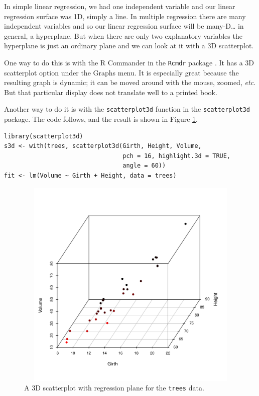 \documentclass[captions=tableheading]{scrbook}
\begin{document}
In simple linear regression, we had one independent variable and our linear regression surface was 1D, simply a line. In multiple regression there are many independent variables and so our linear regression surface will be many-D\ldots{} in general, a hyperplane. But when there are only two explanatory variables the hyperplane is just an ordinary plane and we can look at it with a 3D scatterplot. 

One way to do this is with the \textsf{R} Commander in the \texttt{Rcmdr} package \cite{Foxrcmdr}. It has a 3D scatterplot option under the \textsf{Graphs} menu. It is especially great because the resulting graph is dynamic; it can be moved around with the mouse, zoomed, \emph{etc}. But that particular display does not translate well to a printed book.

Another way to do it is with the \texttt{scatterplot3d} function in the \texttt{scatterplot3d} package. The code follows, and the result is shown in Figure \ref{fig:3D-scatterplot-trees}.


\begin{verbatim}
library(scatterplot3d)
s3d <- with(trees, scatterplot3d(Girth, Height, Volume, 
                                 pch = 16, highlight.3d = TRUE, 
                                 angle = 60))
fit <- lm(Volume ~ Girth + Height, data = trees)
\end{verbatim}



\begin{figure}[th]
    \includegraphics[width=5in, height=4in]{img/3D-scatterplot-trees.pdf}
    \caption[3D scatterplot with regression plane for the \texttt{trees} data]{\small A 3D scatterplot with regression plane for the \texttt{trees} data.}
    \label{fig:3D-scatterplot-trees}
  \end{figure}
\end{document}
